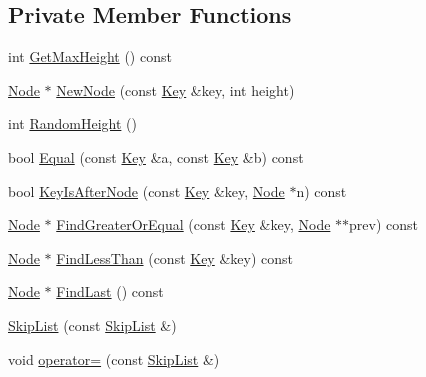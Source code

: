 \subsection*{Private Member Functions}
\begin{DoxyCompactItemize}
\item 
int \hyperlink{classleveldb_1_1_skip_list_a7820710f000cf55fc053b50e683a8bab}{Get\+Max\+Height} () const 
\item 
\hyperlink{structleveldb_1_1_skip_list_1_1_node}{Node} $\ast$ \hyperlink{classleveldb_1_1_skip_list_a23405bab83b4d978887961deff9d0463}{New\+Node} (const \hyperlink{namespaceleveldb_a7e9a9725b13fa0bd922d885280dfab95}{Key} \&key, int height)
\item 
int \hyperlink{classleveldb_1_1_skip_list_a43d757e80d1a4f36c97dbb43ca92cbfc}{Random\+Height} ()
\item 
bool \hyperlink{classleveldb_1_1_skip_list_a3e92dac7be899964ee57e2d81593c55f}{Equal} (const \hyperlink{namespaceleveldb_a7e9a9725b13fa0bd922d885280dfab95}{Key} \&a, const \hyperlink{namespaceleveldb_a7e9a9725b13fa0bd922d885280dfab95}{Key} \&b) const 
\item 
bool \hyperlink{classleveldb_1_1_skip_list_a24eabc6719de6d2df1d9f104667b84d5}{Key\+Is\+After\+Node} (const \hyperlink{namespaceleveldb_a7e9a9725b13fa0bd922d885280dfab95}{Key} \&key, \hyperlink{structleveldb_1_1_skip_list_1_1_node}{Node} $\ast$n) const 
\item 
\hyperlink{structleveldb_1_1_skip_list_1_1_node}{Node} $\ast$ \hyperlink{classleveldb_1_1_skip_list_a6b9fbc50fe94ffc52c2db181ecd32a97}{Find\+Greater\+Or\+Equal} (const \hyperlink{namespaceleveldb_a7e9a9725b13fa0bd922d885280dfab95}{Key} \&key, \hyperlink{structleveldb_1_1_skip_list_1_1_node}{Node} $\ast$$\ast$prev) const 
\item 
\hyperlink{structleveldb_1_1_skip_list_1_1_node}{Node} $\ast$ \hyperlink{classleveldb_1_1_skip_list_af276177e6a17c21a7a26f425eefc46e3}{Find\+Less\+Than} (const \hyperlink{namespaceleveldb_a7e9a9725b13fa0bd922d885280dfab95}{Key} \&key) const 
\item 
\hyperlink{structleveldb_1_1_skip_list_1_1_node}{Node} $\ast$ \hyperlink{classleveldb_1_1_skip_list_acfda915a018c2f918477f48cf12bcc10}{Find\+Last} () const 
\item 
\hyperlink{classleveldb_1_1_skip_list_afb4f491cba16d06b82e96ac6bfcb5fb7}{Skip\+List} (const \hyperlink{classleveldb_1_1_skip_list}{Skip\+List} \&)
\item 
void \hyperlink{classleveldb_1_1_skip_list_a0185293e08c7e581693ba7491298cda9}{operator=} (const \hyperlink{classleveldb_1_1_skip_list}{Skip\+List} \&)
\end{DoxyCompactItemize}
